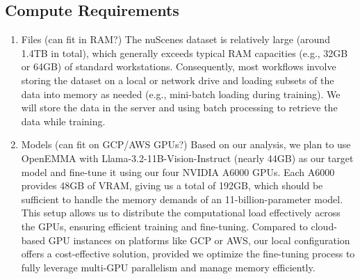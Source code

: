 \documentclass{article} %
\begin{document}
	\subsection{  Compute Requirements}
	\begin{enumerate}
		\item Files (can fit in RAM?)
		The nuScenes dataset is relatively large (around 1.4TB in total), which generally exceeds typical RAM capacities (e.g., 32GB or 64GB) of standard workstations. Consequently, most workflows involve storing the dataset on a local or network drive and loading subsets of the data into memory as needed (e.g., mini-batch loading during training). We will store the data in the server and using batch processing to retrieve the data while training.
		
		
		\item Models (can fit on GCP/AWS GPUs?)
		Based on our analysis, we plan to use OpenEMMA with Llama-3.2-11B-Vision-Instruct (nearly 44GB) as our target model and fine-tune it using our four NVIDIA A6000 GPUs. Each A6000 provides 48GB of VRAM, giving us a total of 192GB, which should be sufficient to handle the memory demands of an 11-billion-parameter model. This setup allows us to distribute the computational load effectively across the GPUs, ensuring efficient training and fine-tuning. Compared to cloud-based GPU instances on platforms like GCP or AWS, our local configuration offers a cost-effective solution, provided we optimize the fine-tuning process to fully leverage multi-GPU parallelism and manage memory efficiently.
	\end{enumerate}
\end{document}
